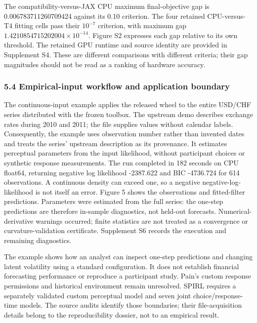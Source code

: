 \documentclass[
  11pt,
]{article}
\begin{document}
The compatibility-versus-JAX CPU maximum final-objective gap is
0.006783711260709424 against its 0.10 criterion. The four retained
CPU-versus-T4 fitting cells pass their \(10^{-7}\) criterion, with
maximum gap \(1.4210854715202004\times10^{-14}\). Figure S2 expresses
each gap relative to its own threshold. The retained GPU runtime and
source identity are provided in Supplement S4. These are different
comparisons with different criteria; their gap magnitudes should not be
read as a ranking of hardware accuracy.

\subsubsection{5.4 Empirical-input workflow and application
boundary}\label{empirical-input-workflow-and-application-boundary}

The continuous-input example applies the released wheel to the entire
USD/CHF series distributed with the frozen toolbox. The upstream demo
describes exchange rates during 2010 and 2011; the file supplies values
without calendar labels. Consequently, the example uses observation
number rather than invented dates and treats the series' upstream
description as its provenance. It estimates perceptual parameters from
the input likelihood, without participant choices or synthetic response
measurements. The run completed in 182 seconds on CPU float64, returning
negative log likelihood -2387.622 and BIC -4736.724 for 614
observations. A continuous density can exceed one, so a negative
negative-log-likelihood is not itself an error. Figure 5 shows the
observations and fitted-filter predictions. Parameters were estimated
from the full series: the one-step predictions are therefore in-sample
diagnostics, not held-out forecasts. Numerical-derivative warnings
occurred; finite statistics are not treated as a convergence or
curvature-validation certificate. Supplement S6 records the execution
and remaining diagnostics.

The example shows how an analyst can inspect one-step predictions and
changing latent volatility using a standard configuration. It does not
establish financial forecasting performance or reproduce a participant
study. Pain's custom response permissions and historical environment
remain unresolved. SPIRL requires a separately validated custom
perceptual model and seven joint choice/response-time models. The source
audits identify those boundaries; their file-acquisition details belong
to the reproducibility dossier, not to an empirical result.
\end{document}
